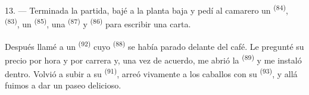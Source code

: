 13. --- Terminada la partida, bajé a la planta baja y pedí al camarero un
 \textsuperscript{(84)},  \textsuperscript{(83)}, un
 \textsuperscript{(85)}, una  \textsuperscript{(87)} y
 \textsuperscript{(86)} para escribir una carta.

Después llamé a un  \textsuperscript{(92)} cuyo 
\textsuperscript{(88)} se había parado delante del café. Le pregunté su precio
por hora y por carrera y, una vez de acuerdo, me abrió la
 \textsuperscript{(89)} y me instaló dentro. Volvió a subir a su
 \textsuperscript{(91)}, arreó vivamente a los caballos con su
 \textsuperscript{(93)}, y allá fuimos a dar un paseo delicioso.
\VUsaut{6.0mm}
\VUfilet{22mm}
